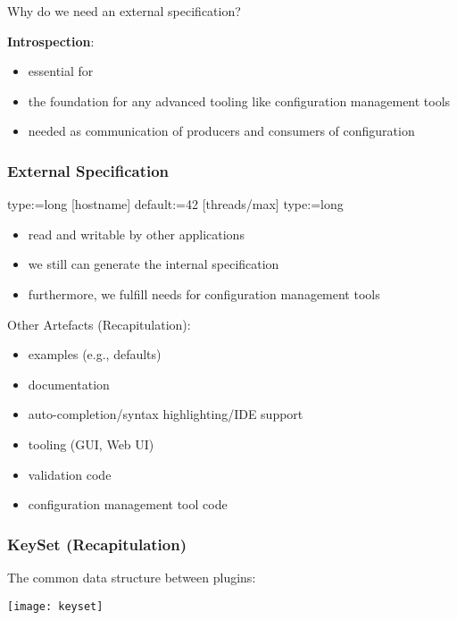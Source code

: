 \begin{frame}
	\begin{task}
	Why do we need an external specification?
	\end{task}

	\pause

	\textbf{Introspection}:
	\begin{itemize}
	\item essential for ~\citet{holland2001nofutz}
	\item the foundation for any advanced tooling like configuration management tools
	\item needed as communication of producers and consumers of configuration
	\end{itemize}
\end{frame}

\begin{frame}[fragile]
	\frametitle{External Specification}

	\begin{code}[gobble=4]
	[port]
	type:=long
	[hostname]
	default:=42
	[threads/max]
	type:=long
	\end{code}

	\begin{itemize}
	\item read and writable by other applications
	\item we still can generate the internal specification
	\item furthermore, we fulfill needs for configuration management tools
	\end{itemize}
\end{frame}

\begin{frame}
	Other Artefacts (Recapitulation):

	\pause

	\begin{itemize}
	\item examples (e.g., defaults)
	\item documentation
	\item auto-completion/syntax highlighting/IDE support
	\item tooling (GUI, Web UI)
	\item validation code
	\item configuration management tool code
	\end{itemize}
\end{frame}

\begin{frame}
	\frametitle{KeySet (Recapitulation)}

	The common data structure between plugins:
	\vspace{1cm}

	\texttt{[image: keyset]}
\end{frame}

